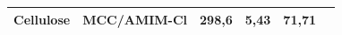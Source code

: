 \begin{table}[!ht]
\begin{tabular}{cccccc}
        Cellulose&MCC/AMIM-Cl&298,6&5,43
        &71,71
        &\cite{Ahankari2022, Xu2020}\\
        \bottomrule
    \end{tabular}

\end{table}